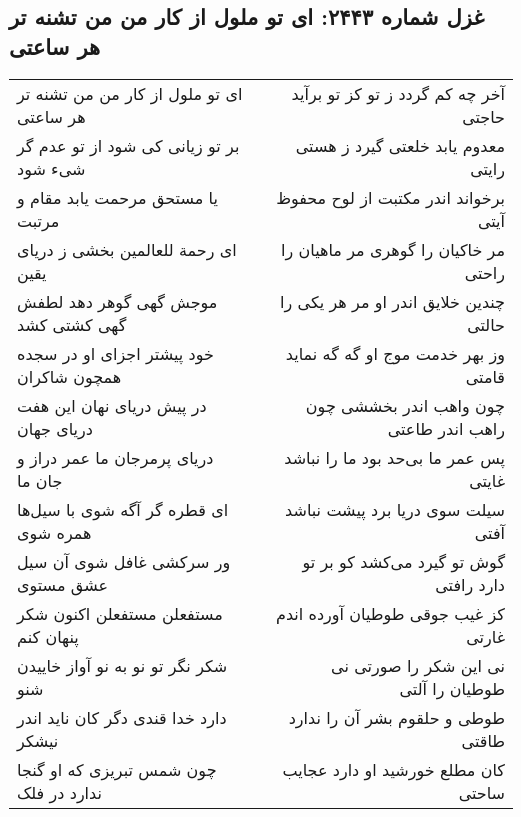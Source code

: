 \begin{center}
\section*{غزل شماره ۲۴۴۳: ای تو ملول از کار من من تشنه تر هر ساعتی}
\label{sec:2443}
\begin{longtable}{l p{0.5cm} r}
ای تو ملول از کار من من تشنه تر هر ساعتی
&&
آخر چه کم گردد ز تو کز تو برآید حاجتی
\\
بر تو زیانی کی شود از تو عدم گر شیء شود
&&
معدوم یابد خلعتی گیرد ز هستی رایتی
\\
یا مستحق مرحمت یابد مقام و مرتبت
&&
برخواند اندر مکتبت از لوح محفوظ آیتی
\\
ای رحمة للعالمین بخشی ز دریای یقین
&&
مر خاکیان را گوهری مر ماهیان را راحتی
\\
موجش گهی گوهر دهد لطفش گهی کشتی کشد
&&
چندین خلایق اندر او مر هر یکی را حالتی
\\
خود پیشتر اجزای او در سجده همچون شاکران
&&
وز بهر خدمت موج او گه گه نماید قامتی
\\
در پیش دریای نهان این هفت دریای جهان
&&
چون واهب اندر بخششی چون راهب اندر طاعتی
\\
دریای پرمرجان ما عمر دراز و جان ما
&&
پس عمر ما بی‌حد بود ما را نباشد غایتی
\\
ای قطره گر آگه شوی با سیل‌ها همره شوی
&&
سیلت سوی دریا برد پیشت نباشد آفتی
\\
ور سرکشی غافل شوی آن سیل عشق مستوی
&&
گوش تو گیرد می‌کشد کو بر تو دارد رافتی
\\
مستفعلن مستفعلن اکنون شکر پنهان کنم
&&
کز غیب جوقی طوطیان آورده اندم غارتی
\\
شکر نگر تو نو به نو آواز خاییدن شنو
&&
نی این شکر را صورتی نی طوطیان را آلتی
\\
دارد خدا قندی دگر کان ناید اندر نیشکر
&&
طوطی و حلقوم بشر آن را ندارد طاقتی
\\
چون شمس تبریزی که او گنجا ندارد در فلک
&&
کان مطلع خورشید او دارد عجایب ساحتی
\\
\end{longtable}
\end{center}

